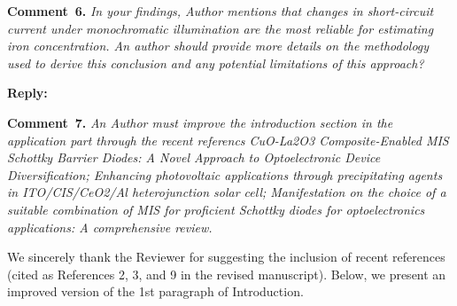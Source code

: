 \documentclass[a4paper,fleqn]{cas-sc}
\begin{document}
\vspace{1cm}
\noindent
\textcolor[rgb]{0.00,0.50,1.00}{\textbf{Comment~6.}}
\emph{In your findings, Author mentions that changes in short-circuit current under monochromatic illumination are the most
reliable for estimating iron concentration.
An author should provide more details on the methodology used to derive this conclusion and any potential limitations of this approach?}



\noindent
\textcolor[rgb]{0.51,0.00,0.00}{\textbf{Reply:}}




\vspace{1cm}
\noindent
\textcolor[rgb]{0.00,0.50,1.00}{\textbf{Comment~7.}}
\emph{An Author must improve the introduction section in the application part through the recent referencs
CuO-La2O3 Composite-Enabled MIS Schottky Barrier Diodes: A Novel Approach to Optoelectronic Device Diversification;
Enhancing photovoltaic applications through precipitating agents in ITO/CIS/CeO2/Al heterojunction solar cell;
Manifestation on the choice of a suitable combination of MIS for proficient Schottky diodes for optoelectronics applications: A comprehensive review.}

\cite{Paul2024,Gayathri2024,AlanSibu2024}

We sincerely thank the Reviewer for suggesting the inclusion of recent references (cited as References 2, 3, and 9 in the revised manuscript).
Below, we present an improved version of the 1st paragraph of Introduction.
\end{document}
